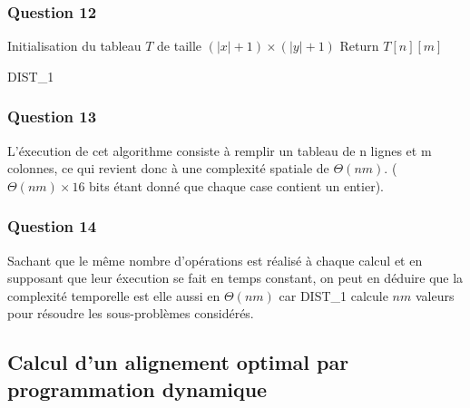 \documentclass[12pt, a4paper]{report}
\begin{document}
\subsubsection{Question 12}
\begin{algorithm}[H]
\SetAlgoLined
{}
Initialisation du tableau $T$ de taille $(|x|+1)\times (|y|+1)$ \;
Return $T\left[n\right]\left[m\right]$
 \caption{DIST\_1}
\end{algorithm}

\subsubsection{Question 13}
L'éxecution de cet algorithme consiste à remplir un tableau de n lignes et m colonnes, ce qui revient donc à une complexité spatiale de $\Theta(nm)$. ($\Theta(nm) \times 16$ bits étant donné que chaque case contient un entier).
\subsubsection{Question 14}
Sachant que le même nombre d'opérations est réalisé à chaque calcul et en supposant que leur éxecution se fait en temps constant, on peut en déduire que la complexité temporelle est elle aussi en $\Theta(nm)$ car DIST\_1 calcule $nm$ valeurs pour résoudre les sous-problèmes considérés.
\subsection{Calcul d'un alignement optimal par programmation dynamique}
\end{document}
